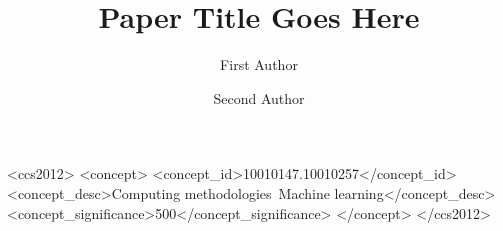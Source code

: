 \documentclass[sigconf]{acmart}
\begin{document}
\title{Paper Title Goes Here}

\author{First Author}

\author{Second Author}

\begin{CCSXML}
<ccs2012>
  <concept>
    <concept_id>10010147.10010257</concept_id>
    <concept_desc>Computing methodologies~Machine learning</concept_desc>
    <concept_significance>500</concept_significance>
  </concept>
</ccs2012>
\end{CCSXML}




\maketitle   %








\end{document}
